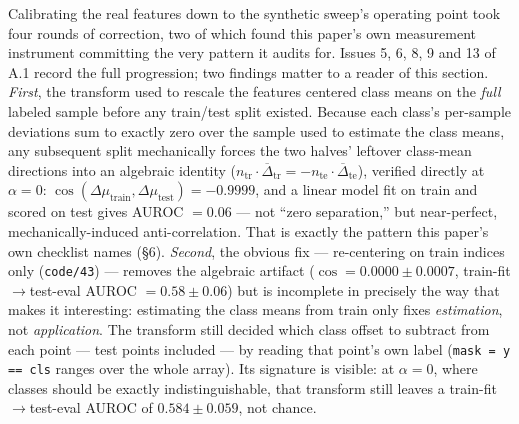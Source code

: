 \documentclass[10pt]{article} %
\begin{document}
Calibrating the real features down to the synthetic sweep's operating point
took four rounds of correction, two of which found this paper's own
measurement instrument committing the very pattern it audits for. Issues 5, 6, 8, 9 and 13 of A.1 record the full progression; two findings matter to a
reader of this section. \emph{First}, the transform used to rescale the
features centered class means on the \emph{full} labeled sample before any
train/test split existed. Because each class's per-sample deviations sum to
exactly zero over the sample used to estimate the class means, any subsequent
split mechanically forces the two halves' leftover class-mean directions into
an algebraic identity ($n_{\text{tr}}\cdot\overline{\Delta}_{\text{tr}} =
-n_{\text{te}}\cdot\overline{\Delta}_{\text{te}}$), verified directly at
$\alpha=0$: $\cos(\Delta\mu_{\text{train}},\Delta\mu_{\text{test}})=-0.9999$,
and a linear model fit on train and scored on test gives AUROC $=0.06$ --- not
``zero separation,'' but near-perfect, mechanically-induced anti-correlation.
That is exactly the pattern this paper's own checklist names (§6). \emph{Second},
the obvious fix --- re-centering on train indices only (\texttt{code/43}) ---
removes the algebraic artifact ($\cos = 0.0000\pm0.0007$,
train-fit$\to$test-eval AUROC $=0.58\pm0.06$) but is incomplete in precisely
the way that makes it interesting: estimating the class means from train only
fixes \emph{estimation}, not \emph{application}. The transform still decided
which class offset to subtract from each point --- test points included --- by
reading that point's own label (\texttt{mask = y == cls} ranges over the whole
array). Its signature is visible: at $\alpha=0$, where classes should be
exactly indistinguishable, that transform still leaves a
train-fit$\to$test-eval AUROC of $0.584\pm0.059$, not chance.
\end{document}
